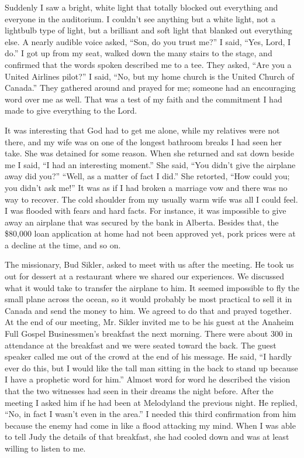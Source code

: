 \documentclass[twoside, 12pt]{book}
\begin{document}
Suddenly I saw a bright, white light that totally blocked out everything and everyone in the auditorium. I couldn't see anything but a white light, not a lightbulb type of light, but a brilliant and soft light that blanked out everything else. A nearly audible voice asked, “Son, do you trust me?” I said, “Yes, Lord, I do.” I got up from my seat, walked down the many stairs to the stage, and confirmed that the words spoken described me to a tee. They asked, “Are you a United Airlines pilot?” I said, “No, but my home church is the United Church of Canada.” They gathered around and prayed for me; someone had an encouraging word over me as well. That was a test of my faith and the commitment I had made to give everything to the Lord.

It was interesting that God had to get me alone, while my relatives were not there, and my wife was on one of the longest bathroom breaks I had seen her take. She was detained for some reason. When she returned and sat down beside me I said, “I had an interesting moment.” She said, “You didn't give the airplane away did you?” “Well, as a matter of fact I did.” She retorted, “How could you; you didn't ask me!” It was as if I had broken a marriage vow and there was no way to recover. The cold shoulder from my usually warm wife was all I could feel. I was flooded with fears and hard facts.  For instance, it was impossible to give away an airplane that was secured by the bank in Alberta. Besides that, the \$80,000 loan application at home had not been approved yet, pork prices were at a decline at the time, and so on.

The missionary, Bud Sikler, asked to meet with us after the meeting. He took us out for dessert at a restaurant where we shared our experiences. We discussed what it would take to transfer the airplane to him. It seemed impossible to fly the small plane across the ocean, so it would probably be most practical to sell it in Canada and send the money to him. We agreed to do that and prayed together. At the end of our meeting, Mr. Sikler invited me to be his guest at the Anaheim Full Gospel Businessmen's breakfast the next morning. There were about 300 in attendance at the breakfast and we were seated toward the back. The guest speaker called me out of the crowd at the end of his message. He said, “I hardly ever do this, but I would like the tall man sitting in the back to stand up because I have a prophetic word for him.” Almost word for word he described the vision that the two witnesses had seen in their dreams the night before. After the meeting I asked him if he had been at Melodyland the previous night. He replied, “No, in fact I wasn't even in the area.” I needed this third confirmation from him because the enemy had come in like a flood attacking my mind. When I was able to tell Judy the details of that breakfast, she had cooled down and was at least willing to listen to me.
\end{document}
